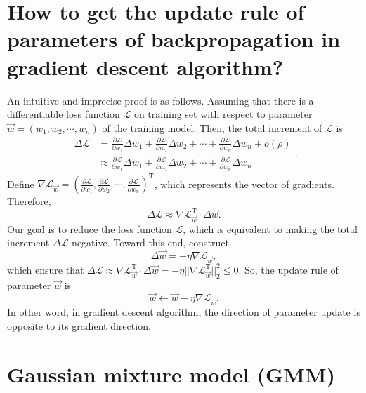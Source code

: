 \documentclass[10pt,onecolumn]{book}
\begin{document}
\section{How to get the update rule of parameters of backpropagation in gradient descent algorithm?}
An intuitive and imprecise proof is as follows. Assuming that there is a differentiable loss function $\mathcal{L}$ on training set with respect to parameter $\vec{w} = (w_1, w_2, \cdots, w_n)$ of the training model. Then, the total increment of $\mathcal{L}$ is
\begin{equation}
\begin{split}
\Delta \mathcal{L} & = \frac{\partial \mathcal{L}}{\partial w_1} \Delta w_1 + \frac{\partial \mathcal{L}}{\partial w_2} \Delta w_2 + \cdots + \frac{\partial \mathcal{L}}{\partial w_n} \Delta w_n + o(\rho) \\
				   & \approx \frac{\partial \mathcal{L}}{\partial w_1} \Delta w_1 + \frac{\partial \mathcal{L}}{\partial w_2} \Delta w_2 + \cdots + \frac{\partial \mathcal{L}}{\partial w_n} \Delta w_n
\end{split}.
\end{equation}
Define $\nabla \mathcal{L}_{\vec{w}} = (\frac{\partial \mathcal{L}}{\partial w_1}, \frac{\partial \mathcal{L}}{\partial w_2}, \cdots, \frac{\partial \mathcal{L}}{\partial w_n})^\mathrm{T}$, which represents the vector of gradients. Therefore, 
\begin{equation}
\Delta \mathcal{L} \approx \nabla \mathcal{L}_{\vec{w}}^\mathrm{T} \cdot \Delta \vec{w}.
\end{equation}
Our goal is to reduce the loss function $\mathcal{L}$, which is equivalent to making the total increment $\Delta \mathcal{L}$ negative. Toward this end, construct 
\begin{equation}
\Delta \vec{w} = -\eta \nabla \mathcal{L}_{\vec{w}},
\end{equation}
which ensure that $\Delta \mathcal{L} \approx \nabla \mathcal{L}_{\vec{w}}^\mathrm{T} \cdot \Delta \vec{w} = - \eta ||\nabla \mathcal{L}_{\vec{w}}^\mathrm{T}||_2^2 \le 0$. So, the update rule of parameter $\vec{w}$ is 
\begin{equation}
\vec{w} \gets \vec{w} -\eta \nabla \mathcal{L}_{\vec{w}}.
\end{equation}
\uline{In other word, in gradient descent algorithm, the direction of parameter update is opposite to its gradient direction.}

\section{Gaussian mixture model (GMM)}
\end{document}
